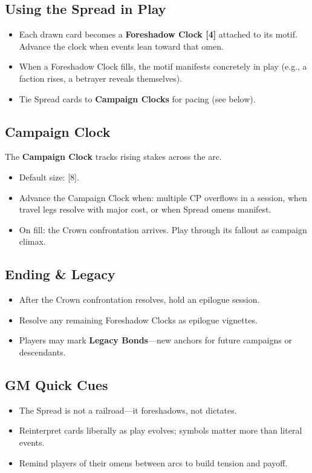 \subsection{Using the Spread in Play}
\begin{itemize}
  \item Each drawn card becomes a \textbf{Foreshadow Clock [4]} attached to its motif. Advance the clock when events lean toward that omen.
  \item When a Foreshadow Clock fills, the motif manifests concretely in play (e.g., a faction rises, a betrayer reveals themselves).
  \item Tie Spread cards to \textbf{Campaign Clocks} for pacing (see below).
\end{itemize}

\subsection{Campaign Clock}
The \textbf{Campaign Clock} tracks rising stakes across the arc.
\begin{itemize}
  \item Default size: [8].
  \item Advance the Campaign Clock when: multiple CP overflows in a session, when travel legs resolve with major cost, or when Spread omens manifest.
  \item On fill: the Crown confrontation arrives. Play through its fallout as campaign climax.
\end{itemize}

\subsection{Ending \& Legacy}
\begin{itemize}
  \item After the Crown confrontation resolves, hold an epilogue session.
  \item Resolve any remaining Foreshadow Clocks as epilogue vignettes.
  \item Players may mark \textbf{Legacy Bonds}—new anchors for future campaigns or descendants.
\end{itemize}

\subsection{GM Quick Cues}
\begin{itemize}
  \item The Spread is not a railroad—it foreshadows, not dictates.
  \item Reinterpret cards liberally as play evolves; symbols matter more than literal events.
  \item Remind players of their omens between arcs to build tension and payoff.
\end{itemize}
